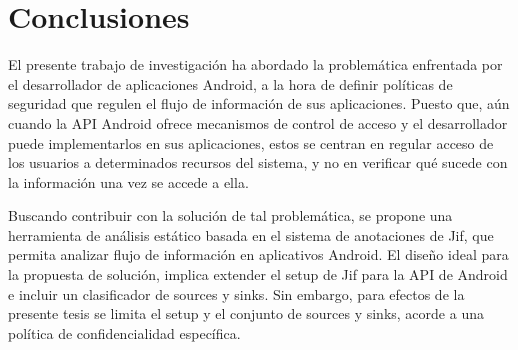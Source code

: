 \section{Conclusiones}
El presente trabajo de investigación ha abordado la problemática enfrentada por
el desarrollador de aplicaciones Android, a la hora de definir políticas de
seguridad que regulen el flujo de información de sus aplicaciones. Puesto que,
aún cuando la API Android ofrece mecanismos de control de acceso y el
desarrollador puede implementarlos en sus aplicaciones, estos se centran en
regular acceso de los usuarios a determinados recursos del sistema, y no en
verificar qué sucede con la información una vez se accede a ella.

Buscando contribuir con la solución de tal problemática, se propone una
herramienta de análisis estático basada en el sistema de anotaciones de Jif, que
permita analizar flujo de información en aplicativos Android. El diseño ideal
para la propuesta de solución, implica extender el setup de Jif para la API de
Android e incluir un clasificador de sources y sinks. Sin embargo, para efectos
de la presente tesis se limita el setup y el conjunto de sources y sinks, acorde
a una política de confidencialidad específica.

